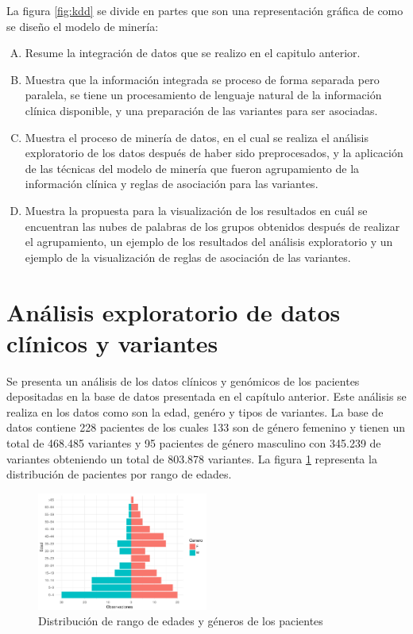  La figura \ref{fig:kdd} se divide en partes que son una representación gráfica de como se diseño el modelo de minería:
 
 \begin{enumerate}[A)]
 	\item Resume la integración de datos que se realizo en el capitulo anterior.
 	\item Muestra que la información integrada se proceso de forma separada pero paralela, se tiene un procesamiento de lenguaje natural de la información clínica disponible, y una preparación de las variantes para ser asociadas.
 	\item Muestra el proceso de minería de datos, en el cual se realiza el análisis exploratorio de los datos después de haber sido preprocesados, y la aplicación de las técnicas del modelo de minería que fueron agrupamiento de la información clínica y reglas de asociación para las variantes.
 	\item  Muestra la propuesta para la visualización de los resultados en cuál se encuentran las nubes de palabras de los grupos obtenidos después de realizar el agrupamiento, un ejemplo de los resultados del análisis exploratorio y un ejemplo de la visualización de reglas de asociación de las variantes.
 \end{enumerate}
 

\section{Análisis exploratorio de datos clínicos y variantes}

Se presenta un análisis de los datos clínicos  y genómicos de los pacientes depositadas en la base de datos presentada en el capítulo anterior. Este análisis se realiza en los datos como son la edad, genéro y tipos de variantes. La base de datos contiene 228 pacientes de los cuales 133 son de género femenino y tienen un total de 468.485 variantes y 95 pacientes de género masculino con 345.239 de variantes obteniendo  un total de 803.878 variantes. La  figura \ref{fig:general} representa la distribución de pacientes por rango de edades.\\

\begin{figure}[h]
	\centering
	\includegraphics[width=0.5\textwidth]{Kap4/general}
	\caption{Distribución de rango de edades y géneros de los pacientes}
	\label{fig:general}
\end{figure}


